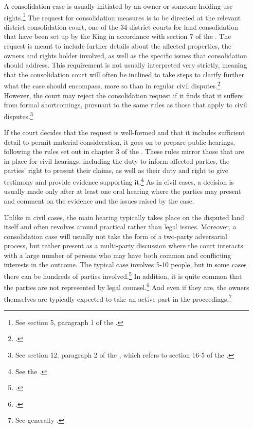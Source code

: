 A consolidation case is usually initiated by an owner or someone holding use rights.\footnote{See section 5, paragraph 1 of the \dni\cite{lca79}.} The request for consolidation measures is to be directed at the relevant district consolidation court, one of the 34 district courts for land consolidation that have been set up by the King in accordance with section 7 of the \cite{lca79}. The request is meant to include further details about the affected properties, the owners and rights holder involved, as well as the specific issues that consolidation should address. This requirement is not usually interpreted very strictly, meaning that the consolidation court will often be inclined to take steps to clarify further what the case should encompass, more so than in regular civil disputes.\footcite[39]{langbach09} However, the court may reject the consolidation request if it finds that it suffers from formal shortcomings, pursuant to the same rules as those that apply to civil disputes.\footnote{See section 12, paragraph 2 of the \cite{lca79}, which refers to section 16-5 of the \cite{cda05}.}

If the court decides that the request is well-formed and that it includes sufficient detail to permit material consideration, it goes on to prepare public hearings, following the rules set out in chapter 3 of the \cite{lca79}. These rules mirror those that are in place for civil hearings, including the duty to inform affected parties, the parties' right to present their claims, as well as their duty and right to give testimony and provide evidence supporting it.\footnote{See the \dni\cite[13|15|17 a)|18]{lca79}.} As in civil cases, a decision is usually made only after at least one oral hearing where the parties may present and comment on the evidence and the issues raised by the case.

Unlike in civil cases, the main hearing typically takes place on the disputed land itself and often revolves around practical rather than legal issues. Moreover, a consolidation case will usually not take the form of a two-party adversarial process, but rather present as a multi-party discussion where the court interacts with a large number of persons who may have both common and conflicting interests in the outcome. The typical case involves 5-10 people, but in some cases there can be hundreds of parties involved.\footcite[39]{langbach09} In addition, it is quite common that the parties are not represented by legal counsel.\footcite[109-111]{rognes00} And even if they are, the owners themselves are typically expected to take an active part in the proceedings.\footnote{See generally \cite{rognes00}.}

